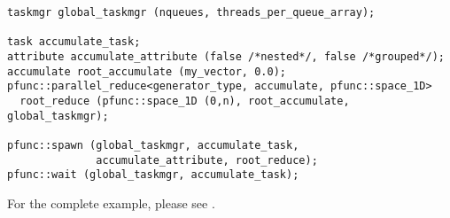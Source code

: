 \begin{center}
\begin{minipage}{0.7\textwidth}
\begin{lstlisting}
taskmgr global_taskmgr (nqueues, threads_per_queue_array);

task accumulate_task;
attribute accumulate_attribute (false /*nested*/, false /*grouped*/);
accumulate root_accumulate (my_vector, 0.0);
pfunc::parallel_reduce<generator_type, accumulate, pfunc::space_1D> 
  root_reduce (pfunc::space_1D (0,n), root_accumulate, global_taskmgr);

pfunc::spawn (global_taskmgr, accumulate_task, 
              accumulate_attribute, root_reduce);
pfunc::wait (global_taskmgr, accumulate_task);
\end{lstlisting}
\end{minipage}
\end{center}
%
For the complete example, please see .

